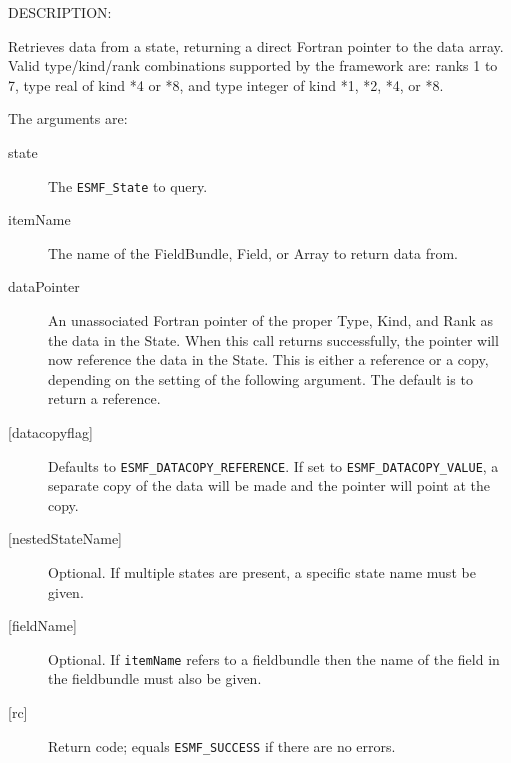 {\sf DESCRIPTION:\\ }

 
   Retrieves data from a state, returning a direct Fortran pointer to 
   the data array. 
   Valid type/kind/rank combinations supported by the 
   framework are: ranks 1 to 7, type real of kind *4 or *8, 
   and type integer of kind *1, *2, *4, or *8. 
   
   The arguments are: 
   \begin{description} 
   \item[state] 
   The {\tt ESMF\_State} to query. 
   \item[itemName] 
   The name of the FieldBundle, Field, or Array to return data from. 
   \item[dataPointer] 
   An unassociated Fortran pointer of the proper Type, Kind, and Rank as the data 
   in the State. When this call returns successfully, the pointer will now reference 
   the data in the State. This is either a reference or a copy, depending on the 
   setting of the following argument. The default is to return a reference. 
   \item[{[datacopyflag]}] 
   Defaults to {\tt ESMF\_DATACOPY\_REFERENCE}. If set to {\tt ESMF\_DATACOPY\_VALUE}, a separate 
   copy of the data will be made and the pointer will point at the copy. 
   \item[{[nestedStateName]}] 
   Optional. If multiple states are present, a specific state name must be given. 
   \item[{[fieldName]}] 
   Optional. If {\tt itemName} refers to a fieldbundle then the name of the field 
   in the fieldbundle must also be given. 
   \item[{[rc]}] 
   Return code; equals {\tt ESMF\_SUCCESS} if there are no errors. 
   \end{description} 
   
\setlength{\parskip}{\oldparskip}
\setlength{\parindent}{\oldparindent}
\setlength{\baselineskip}{\oldbaselineskip}
